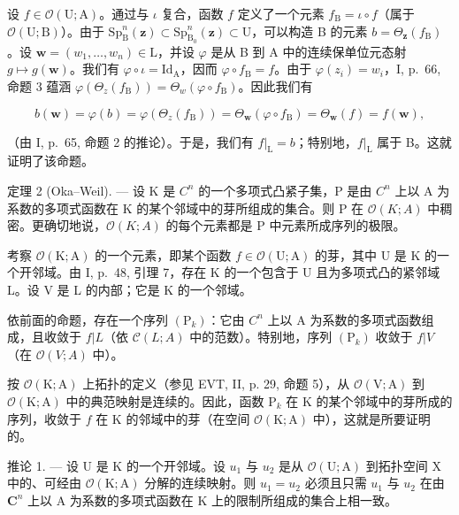 设 \(f \in \mathcal{O}(\mathrm{U};\mathrm{A})\)。通过与 \(\iota\) 复合，函数 \(f\) 定义了一个元素 \(f_{\mathrm{B}} = \iota \circ f\)（属于 \(\mathcal{O}(\mathrm{U};\mathrm{B})\)）。由于 \(\mathrm{Sp}_{\mathrm{B}}^{n}(\boldsymbol{z}) \subset \mathrm{Sp}_{\mathrm{B}_{0}}^{n}(\boldsymbol{z}) \subset \mathrm{U}\)，可以构造 B 的元素 \(b = \Theta_{\boldsymbol{z}}(f_{\mathrm{B}})\)。设 \(\boldsymbol{w} = (w_{1},\ldots ,w_{n}) \in \mathrm{L}\)，并设 \(\varphi\) 是从 B 到 A 中的连续保单位元态射 \(g \mapsto g(\boldsymbol{w})\)。我们有 \(\varphi \circ \iota = \mathrm{Id}_{\mathrm{A}}\)，因而 \(\varphi \circ f_{\mathrm{B}} = f\)。由于 \(\varphi (z_i) = w_i\)，I, p.~66, 命题 3 蕴涵 \(\varphi (\Theta_z(f_{\mathrm{B}})) = \Theta_w(\varphi \circ f_{\mathrm{B}})\)。因此我们有

\[
b (\pmb {w}) = \varphi (b) = \varphi (\Theta_ {z} (f _ {\mathrm{B}})) = \Theta_ {\pmb {w}} (\varphi \circ f _ {\mathrm{B}}) = \Theta_ {\pmb {w}} (f) = f (\pmb {w}),
\]

（由 I, p.~65, 命题 2 的推论）。于是，我们有 \(f|_{\mathrm{L}} = b\)；特别地，\(f|_{\mathrm{L}}\) 属于 B。这就证明了该命题。

定理 2 (Oka--Weil). --- 设 K 是 \(C^{n}\) 的一个多项式凸紧子集，P 是由 \(C^{n}\) 上以 A 为系数的多项式函数在 K 的某个邻域中的芽所组成的集合。则 P 在 \(\mathcal{O}(K;A)\) 中稠密。更确切地说，\(\mathcal{O}(K;A)\) 的每个元素都是 P 中元素所成序列的极限。

考察 \(\mathcal{O}(\mathrm{K};\mathrm{A})\) 的一个元素，即某个函数 \(f\in \mathcal{O}(\mathrm{U};\mathrm{A})\) 的芽，其中 U 是 K 的一个开邻域。由 I, p.~48, 引理 7，存在 K 的一个包含于 U 且为多项式凸的紧邻域 L。设 V 是 L 的内部；它是 K 的一个邻域。

依前面的命题，存在一个序列 \((\mathrm{P}_{k})\)：它由 \(C^{n}\) 上以 A 为系数的多项式函数组成，且收敛于 \(f|L\)（依 \(\mathcal{C}(L;A)\) 中的范数）。特别地，序列 \((\mathrm{P}_{k})\) 收敛于 \(f|V\)（在 \(\mathcal{O}(V;A)\) 中）。

按 \(\mathcal{O}(\mathrm{K};\mathrm{A})\) 上拓扑的定义（参见 EVT, II, p. 29, 命题 5），从 \(\mathcal{O}(\mathrm{V};\mathrm{A})\) 到 \(\mathcal{O}(\mathrm{K};\mathrm{A})\) 中的典范映射是连续的。因此，函数 \(\mathrm{P}_k\) 在 K 的某个邻域中的芽所成的序列，收敛于 \(f\) 在 K 的邻域中的芽（在空间 \(\mathcal{O}(\mathrm{K};\mathrm{A})\) 中），这就是所要证明的。

推论 1. --- 设 U 是 K 的一个开邻域。设 \(u_{1}\) 与 \(u_{2}\) 是从 \(\mathcal{O}(\mathrm{U};\mathrm{A})\) 到拓扑空间 X 中的、可经由 \(\mathcal{O}(\mathrm{K};\mathrm{A})\) 分解的连续映射。则 \(u_{1}=u_{2}\) 必须且只需 \(u_{1}\) 与 \(u_{2}\) 在由 \(\mathbf{C}^{n}\) 上以 A 为系数的多项式函数在 K 上的限制所组成的集合上相一致。

